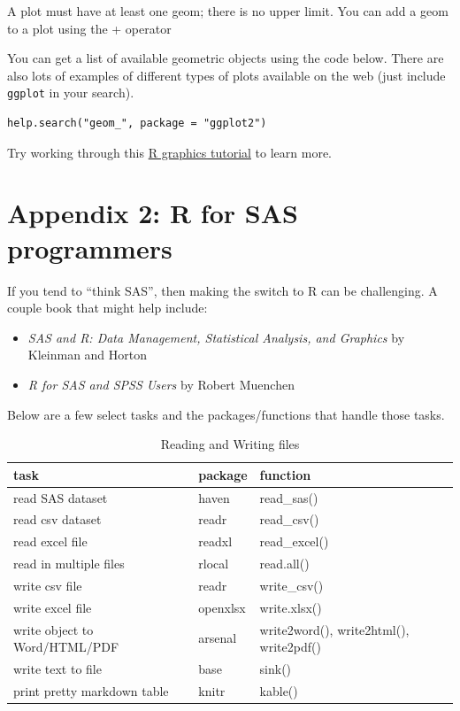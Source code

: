 \documentclass[
]{book}
\providecommand{\tightlist}{%
  \setlength{\itemsep}{0pt}\setlength{\parskip}{0pt}}
\begin{document}
A plot must have at least one geom; there is no upper limit. You can add a geom to a plot using the + operator

You can get a list of available geometric objects using the code below. There are also lots of examples of different types of plots available on the web (just include \texttt{ggplot} in your search).

\begin{verbatim}
help.search("geom_", package = "ggplot2")
\end{verbatim}

Try working through this \href{https://tutorials.iq.harvard.edu/R/Rgraphics/Rgraphics.html\#putting_it_all_together}{R graphics tutorial} to learn more.

\hypertarget{appendix-2-r-for-sas-programmers}{%
\section{Appendix 2: R for SAS programmers}\label{appendix-2-r-for-sas-programmers}}

If you tend to ``think SAS'', then making the switch to R can be challenging. A couple book that might help include:

\begin{itemize}
\tightlist
\item
  \emph{SAS and R: Data Management, Statistical Analysis, and Graphics} by Kleinman and Horton
\item
  \emph{R for SAS and SPSS Users} by Robert Muenchen
\end{itemize}

Below are a few select tasks and the packages/functions that handle those tasks.

\begin{table}

\caption{\label{tab:unnamed-chunk-2}Reading and Writing files}
\centering
\begin{tabular}[t]{l|l|l}
\hline
task & package & function\\
\hline
read SAS dataset & haven & read\_sas()\\
\hline
read csv dataset & readr & read\_csv()\\
\hline
read excel file & readxl & read\_excel()\\
\hline
read in multiple files & rlocal & read.all()\\
\hline
write csv file & readr & write\_csv()\\
\hline
write excel file & openxlsx & write.xlsx()\\
\hline
write object to Word/HTML/PDF & arsenal & write2word(), write2html(), write2pdf()\\
\hline
write text to file & base & sink()\\
\hline
print pretty markdown table & knitr & kable()\\
\hline
\end{tabular}
\end{table}
\end{document}
